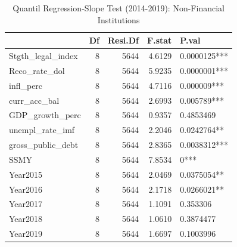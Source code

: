 \begin{table}[ht]
\centering
\caption{Quantil Regression-Slope Test (2014-2019): Non-Financial Institutions} 
\begingroup\small
\begin{tabular}{lrrrl}
  \toprule
 & Df & Resi.Df & F.stat & P.val \\ 
  \midrule
Stgth\_legal\_index & 8 & 5644 & 4.6129 & 0.0000125*** \\ 
  Reco\_rate\_dol & 8 & 5644 & 5.9235 & 0.0000001*** \\ 
  infl\_perc & 8 & 5644 & 4.7116 & 0.000009*** \\ 
  curr\_acc\_bal & 8 & 5644 & 2.6993 & 0.005789*** \\ 
  GDP\_growth\_perc & 8 & 5644 & 0.9357 & 0.4853469 \\ 
  unempl\_rate\_imf & 8 & 5644 & 2.2046 & 0.0242764** \\ 
  gross\_public\_debt & 8 & 5644 & 2.8365 & 0.0038312*** \\ 
  SSMY & 8 & 5644 & 7.8534 & 0*** \\ 
  Year2015 & 8 & 5644 & 2.0469 & 0.0375054** \\ 
  Year2016 & 8 & 5644 & 2.1718 & 0.0266021** \\ 
  Year2017 & 8 & 5644 & 1.1091 & 0.353306 \\ 
  Year2018 & 8 & 5644 & 1.0610 & 0.3874477 \\ 
  Year2019 & 8 & 5644 & 1.6697 & 0.1003996 \\ 
   \bottomrule
\end{tabular}
\endgroup
\end{table}

